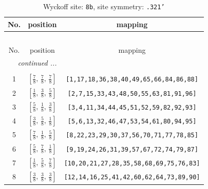 \documentclass[fleqn,8pt]{jsarticle}
\begin{document}
\begin{longtable}{ccc}
\caption{Wyckoff site: {\tt 8b}, site symmetry: {\tt .321'}}
 \\
 \hline \hline
No. & position & mapping \\ \hline \endfirsthead

\multicolumn{2}{l}{\tablename\ \thetable{}} \\
 \hline \hline
No. & position & mapping \\ \hline \endhead

 \hline \hline
\multicolumn{2}{r}{\footnotesize\it continued ...} \\ \endfoot

 \hline \hline
\multicolumn{2}{r}{} \\ \endlastfoot

1 & $\left[ \frac{7}{8},\, \frac{7}{8},\, \frac{7}{8} \right]$ & {\tt [1,17,18,36,38,40,49,65,66,84,86,88]} \\ \hline
2 & $\left[ \frac{1}{8},\, \frac{3}{8},\, \frac{5}{8} \right]$ & {\tt [2,7,15,33,43,48,50,55,63,81,91,96]} \\ \hline
3 & $\left[ \frac{5}{8},\, \frac{1}{8},\, \frac{3}{8} \right]$ & {\tt [3,4,11,34,44,45,51,52,59,82,92,93]} \\ \hline
4 & $\left[ \frac{3}{8},\, \frac{5}{8},\, \frac{1}{8} \right]$ & {\tt [5,6,13,32,46,47,53,54,61,80,94,95]} \\ \hline
5 & $\left[ \frac{7}{8},\, \frac{1}{8},\, \frac{5}{8} \right]$ & {\tt [8,22,23,29,30,37,56,70,71,77,78,85]} \\ \hline
6 & $\left[ \frac{5}{8},\, \frac{7}{8},\, \frac{1}{8} \right]$ & {\tt [9,19,24,26,31,39,57,67,72,74,79,87]} \\ \hline
7 & $\left[ \frac{1}{8},\, \frac{5}{8},\, \frac{7}{8} \right]$ & {\tt [10,20,21,27,28,35,58,68,69,75,76,83]} \\ \hline
8 & $\left[ \frac{3}{8},\, \frac{3}{8},\, \frac{3}{8} \right]$ & {\tt [12,14,16,25,41,42,60,62,64,73,89,90]} \\
\end{longtable}
\renewcommand{\arraystretch}{1.2}
\end{document}
